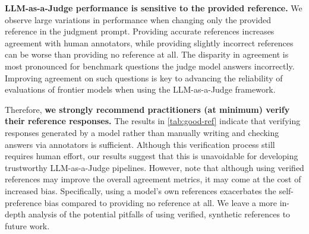 \documentclass{article}
\begin{document}
{\bf LLM-as-a-Judge performance is sensitive to the provided reference.} We observe large variations in performance when changing only the provided reference in the judgment prompt. Providing accurate references increases agreement with human annotators, while providing slightly incorrect references can be worse than providing no reference at all. The disparity in agreement is most pronounced for benchmark questions the judge model answers incorrectly. Improving agreement on such questions is key to advancing the reliability of evaluations of frontier models when using the LLM-as-a-Judge framework.

Therefore, {\bf we strongly recommend practitioners (at minimum) verify their reference responses.} The results in \cref{tab:good-ref} indicate that verifying responses generated by a model rather than manually writing and checking answers via annotators is sufficient. Although this verification process still requires human effort, our results suggest that this is unavoidable for developing trustworthy LLM-as-a-Judge pipelines. However, note that although using verified references may improve the overall agreement metrics, it may come at the cost of increased bias. Specifically, using a model's own references exacerbates the self-preference bias compared to providing no reference at all. We leave a more in-depth analysis of the potential pitfalls of using verified, synthetic references to future work.






\appendix


\end{document}
